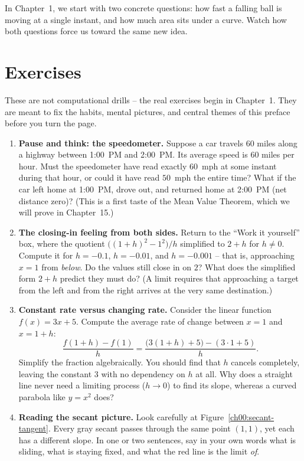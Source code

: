 In Chapter~1, we start with two concrete questions: how fast a falling ball is moving at a single instant,
and how much area sits under a curve. Watch how both questions force us toward the same new idea.

\section*{Exercises}

These are not computational drills -- the real exercises begin in Chapter~1. They are meant to fix
the habits, mental pictures, and central themes of this preface before you turn the page.

\begin{enumerate}
  \item \textbf{Pause and think: the speedometer.} Suppose a car travels $60$ miles along a highway
  between 1:00~PM and 2:00~PM. Its average speed is $60$ miles per hour. Must the speedometer have
  read exactly $60$~mph at some instant during that hour, or could it have read $50$~mph the entire
  time? What if the car left home at 1:00~PM, drove out, and returned home at 2:00~PM (net distance zero)?
  (This is a first taste of the Mean Value Theorem, which we will prove in Chapter~15.)

  \item \textbf{The closing-in feeling from both sides.} Return to the ``Work it yourself'' box, where
  the quotient $\bigl((1+h)^2-1^2\bigr)/h$ simplified to $2+h$ for $h \neq 0$. Compute it for $h=-0.1$,
  $h=-0.01$, and $h=-0.001$ -- that is, approaching $x=1$ from \emph{below}. Do the values still close
  in on $2$? What does the simplified form $2+h$ predict they must do? (A limit requires that approaching
  a target from the left and from the right arrives at the very same destination.)

  \item \textbf{Constant rate versus changing rate.} Consider the linear function $f(x) = 3x + 5$.
  Compute the average rate of change between $x = 1$ and $x = 1+h$:
  \[
    \frac{f(1+h) - f(1)}{h} = \frac{\bigl(3(1+h) + 5\bigr) - (3 \cdot 1 + 5)}{h}.
  \]
  Simplify the fraction algebraically. You should find that $h$ cancels completely, leaving the constant $3$
  with no dependency on $h$ at all. Why does a straight line never need a limiting process ($h \to 0$)
  to find its slope, whereas a curved parabola like $y = x^2$ does?

  \item \textbf{Reading the secant picture.} Look carefully at Figure~\ref{ch00:secant-tangent}. Every gray
  secant passes through the same point $(1,1)$, yet each has a different slope. In one or two
  sentences, say in your own words what is sliding, what is staying fixed, and what the red line is
  the limit \emph{of}.


\end{enumerate}
